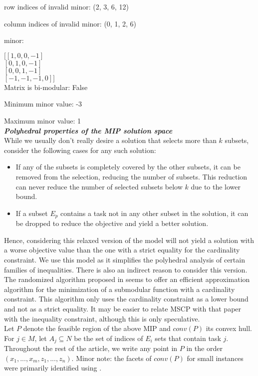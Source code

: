\documentclass[12pt]{article}
\newcommand{\subheading}[1]{\emph{\textbf{#1}}}
\begin{document}
row indices of invalid minor: (2, 3, 6, 12)

column indices of invalid minor: (0, 1, 2, 6)

minor:

$[[ 1,  0,  0, -1]$\\
$ [ 0,  1,  0, -1]$\\
$ [ 0,  0,  1, -1]$\\
$ [-1, -1, -1,  0]]$\\

Matrix is bi-modular: False

Minimum minor value: -3

Maximum minor value: 1\\

\subheading{Polyhedral properties of the MIP solution space}\\

While we usually don't really desire a solution that selects more than $k$ subsets, consider the following cases for any such solution:

\begin{itemize}
\item If any of the subsets is completely covered by the other subsets, it can be removed from the selection, reducing the number of subsets. This reduction can never reduce the number of selected subsets below $k$ due to the lower bound.
\item If a subset $E_p$ contains a task not in any other subset in the solution, it can be dropped to reduce the objective and yield a better solution.
\end{itemize}

Hence, considering this relaxed version of the model will not yield a solution with a worse objective value than the one with a strict equality for the cardinality constraint. We use this model as it simplifies the polyhedral analysis of certain families of inequalities. There is also an indirect reason to consider this version. The randomized algorithm proposed in \cite{SvitkinaFleischer2011} seems to offer an efficient approximation algorithm for the minimization of a submodular function with a cardinality constraint. This algorithm only uses the cardinality constraint as a lower bound and not as a strict equality. It may be easier to relate MSCP with that paper with the inequality constraint, although this is only speculative.\\

Let $P$ denote the feasible region of the above MIP and $conv(P)$ its convex hull. For $j \in M$, let $A_j \subseteq N$ be the set of indices of $E_i$ sets that contain task $j$. Throughout the rest of the article, we write any point in $P$ in the order $(x_1,...,x_m,z_1,...,z_n)$. Minor note: the facets of $conv(P)$ for small instances were primarily identified using \cite{polymake}.\\
\end{document}
